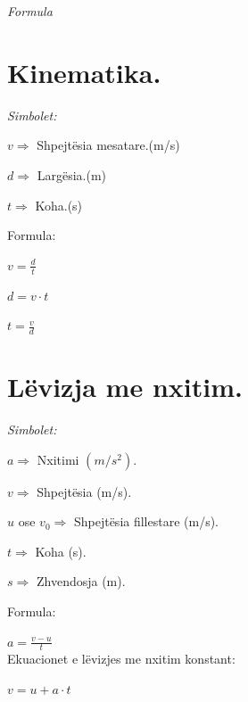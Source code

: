 \documentclass[twocolumn]{article}
\begin{document}
\tableofcontents

	
	
	\textit{Formula}
	
	\section{Kinematika.}
	
	
	\begin{center}
		\textit{Simbolet:}
	\end{center}
	
	
	$v \Rightarrow$ Shpejtësia mesatare.(m/s)
	
	$d \Rightarrow$ Largësia.(m)
	
	$t \Rightarrow $ Koha.(s)
	
	\begin{center}
		Formula:
	\end{center}
	
	$v = \frac{d}{t}$
	
	$d = v \cdot t$
	
	$t = \frac{v}{d}$
	
	\section{Lëvizja me nxitim.}
	
	\begin{center}
		\textit{Simbolet:}
	\end{center}
	
	$a \Rightarrow$ Nxitimi $(m/s^2)$.
	
	$v \Rightarrow $ Shpejtësia (m/s).
	
	$u $ ose $ v_0 \Rightarrow$ Shpejtësia fillestare (m/s).
	
	$t \Rightarrow$ Koha (s).
	
	$s \Rightarrow$ Zhvendosja (m).
	
	\begin{center}
		Formula:
	\end{center}
	
	$a=\frac{v-u}{t}$\\
	
	
	Ekuacionet e lëvizjes me nxitim konstant:
	
	$v=u + a\cdot t$
	
\end{document}
